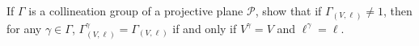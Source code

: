If $\Gamma$ is a collineation group of a projective plane $\mathcal{P}$, show that if $\Gamma_{(V,\ell)} \neq 1$, then for any $\gamma \in \Gamma$, $\Gamma_{(V,\ell)}^\gamma = \Gamma_{(V,\ell)}$ if and only if $V^\gamma = V$ and $\ell^\gamma = \ell$.

